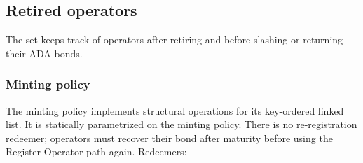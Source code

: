 \documentclass[../midgard.tex]{subfiles}
\begin{document}
\subsection{Retired operators}
\label{h:retired-operators}

The  set keeps track of operators after retiring and before slashing or returning their ADA bonds.

\subsubsection{Minting policy}
\label{h:retired-operators-minting-policy}

The  minting policy implements structural operations for its key-ordered linked list.
It is statically parametrized on the  minting policy.
There is no re-registration redeemer; operators must recover their bond after maturity before using the Register Operator path again.
Redeemers:
\end{document}
